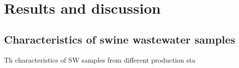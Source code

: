 \section{Results and discussion}
\subsection{Characteristics of swine wastewater samples}
Th characteristics of SW samples from different production sta